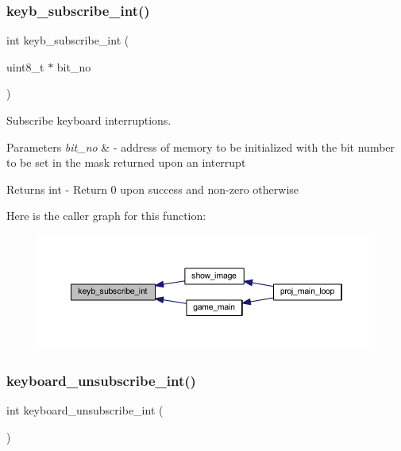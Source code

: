 \subsubsection{\texorpdfstring{keyb\+\_\+subscribe\+\_\+int()}{keyb\_subscribe\_int()}}
{\footnotesize\ttfamily int keyb\+\_\+subscribe\+\_\+int (\begin{DoxyParamCaption}\item[{uint8\+\_\+t $\ast$}]{bit\+\_\+no }\end{DoxyParamCaption})}



Subscribe keyboard interruptions. 


\begin{DoxyParams}{Parameters}
{\em bit\+\_\+no} & -\/ address of memory to be initialized with the bit number to be set in the mask returned upon an interrupt \\
\hline
\end{DoxyParams}
\begin{DoxyReturn}{Returns}
int -\/ Return 0 upon success and non-\/zero otherwise 
\end{DoxyReturn}
Here is the caller graph for this function\+:
\nopagebreak
\begin{figure}[H]
\begin{center}
\leavevmode
\includegraphics[width=350pt]{group__keyboard_gaa8e63a9750dae94729779940343f0150_icgraph}
\end{center}
\end{figure}
\mbox{\label{group__keyboard_gac95aea27a5e91b363b876fed881f368f}} 
\subsubsection{\texorpdfstring{keyboard\+\_\+unsubscribe\+\_\+int()}{keyboard\_unsubscribe\_int()}}
{\footnotesize\ttfamily int keyboard\+\_\+unsubscribe\+\_\+int (\begin{DoxyParamCaption}{ }\end{DoxyParamCaption})}



